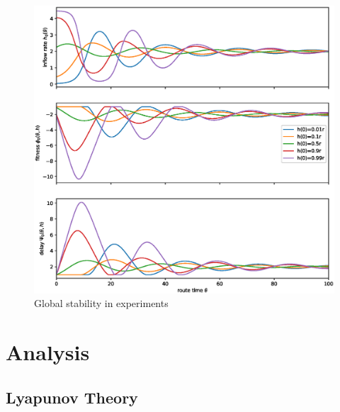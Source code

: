 \documentclass[10pt]{beamer}
\begin{document}
\begin{frame}
  

	\begin{center}
		\begin{figure}
			\includegraphics[scale=0.3]{img/pres-replicator_global_stability.eps}
			\caption{Global stability in experiments}	
		\end{figure}	  
	\end{center}  
  
\end{frame}

\section{Analysis}

\subsection{Lyapunov Theory}
\end{document}
